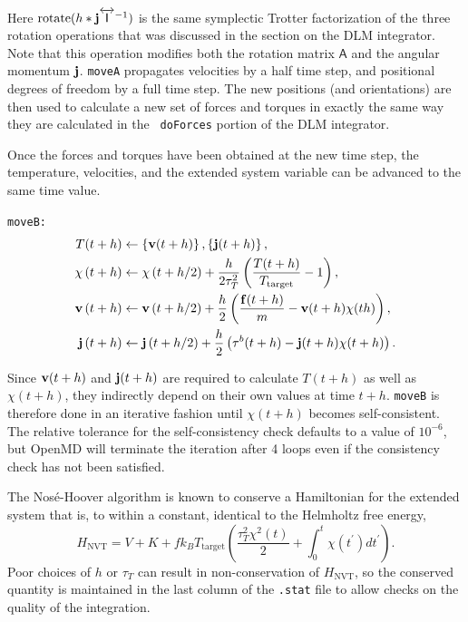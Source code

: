\documentclass[letterpaper]{report}
\begin{document}
Here $\mathrm{rotate}(h * {\bf j}
\overleftrightarrow{\mathsf{I}}^{-1})$ is the same symplectic Trotter
factorization of the three rotation operations that was discussed in
the section on the DLM integrator.  Note that this operation modifies
both the rotation matrix $\mathsf{A}$ and the angular momentum ${\bf
j}$.  {\tt moveA} propagates velocities by a half time step, and
positional degrees of freedom by a full time step.  The new positions
(and orientations) are then used to calculate a new set of forces and
torques in exactly the same way they are calculated in the {\tt
doForces} portion of the DLM integrator.

Once the forces and torques have been obtained at the new time step,
the temperature, velocities, and the extended system variable can be
advanced to the same time value.

{\tt moveB:}
\begin{align*}
T(t + h) &\leftarrow \left\{{\bf v}(t + h)\right\}, 
	\left\{{\bf j}(t + h)\right\}, \\
%
\chi\left(t + h \right) &\leftarrow \chi\left(t + h /
	2 \right) + \frac{h}{2 \tau_T^2} \left( \frac{T(t+h)}
	{T_{\mathrm{target}}} - 1 \right), \\
%
{\bf v}\left(t + h \right)  &\leftarrow {\bf v}\left(t 
	+ h / 2 \right) + \frac{h}{2} \left(
	\frac{{\bf f}(t + h)}{m} - {\bf v}(t + h)
	\chi(t h)\right) ,\\
%
{\bf j}\left(t + h \right) &\leftarrow {\bf j}\left(t
	+ h / 2 \right) + \frac{h}{2} 
	\left( {\bf \tau}^b(t + h) - {\bf j}(t + h) 
	\chi(t + h) \right) .
\end{align*}

Since ${\bf v}(t + h)$ and ${\bf j}(t + h)$ are required to calculate
$T(t + h)$ as well as $\chi(t + h)$, they indirectly depend on their
own values at time $t + h$.  {\tt moveB} is therefore done in an
iterative fashion until $\chi(t + h)$ becomes self-consistent.  The
relative tolerance for the self-consistency check defaults to a value
of $\mbox{10}^{-6}$, but OpenMD will terminate the iteration
after 4 loops even if the consistency check has not been satisfied.

The Nos\'e-Hoover algorithm is known to conserve a Hamiltonian for the
extended system that is, to within a constant, identical to the
Helmholtz free energy,\cite{melchionna93}
\begin{equation}
H_{\mathrm{NVT}} = V + K + f k_B T_{\mathrm{target}} \left(
\frac{\tau_{T}^2 \chi^2(t)}{2} + \int_{0}^{t} \chi(t^\prime) dt^\prime
\right).
\end{equation}
Poor choices of $h$ or $\tau_T$ can result in non-conservation
of $H_{\mathrm{NVT}}$, so the conserved quantity is maintained in the
last column of the {\tt .stat} file to allow checks on the quality of
the integration.
\end{document}
